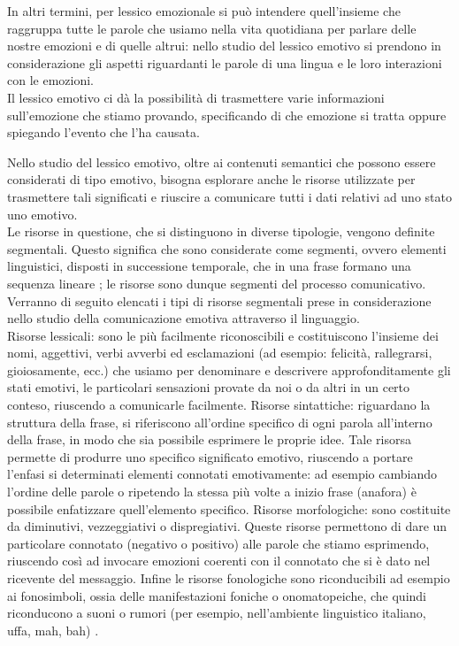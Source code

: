 In altri termini, per lessico emozionale si può intendere quell'insieme che raggruppa tutte le parole che usiamo nella vita quotidiana per parlare delle nostre emozioni e di quelle altrui: nello studio del lessico emotivo si prendono in considerazione gli aspetti riguardanti le parole di una lingua e le loro interazioni con le emozioni.\\
Il lessico emotivo ci dà la possibilità di trasmettere varie informazioni sull'emozione che stiamo provando, specificando di che emozione si tratta oppure spiegando l'evento che l'ha causata.

Nello studio del lessico emotivo, oltre ai contenuti semantici che possono essere considerati di tipo emotivo, bisogna esplorare anche le risorse utilizzate per trasmettere tali significati e riuscire a comunicare tutti i dati relativi ad uno stato uno emotivo.\\
Le risorse in questione, che si distinguono in diverse tipologie, vengono definite segmentali. Questo significa che sono considerate come segmenti, ovvero elementi linguistici, disposti in successione temporale, che in una frase formano una sequenza lineare \parencite{segmentale}; le risorse sono dunque segmenti del processo comunicativo.\\
Verranno di seguito elencati i tipi di risorse segmentali prese in considerazione nello studio della comunicazione emotiva attraverso il linguaggio.\\
Risorse lessicali: sono le più facilmente riconoscibili e costituiscono l'insieme dei nomi, aggettivi, verbi avverbi ed esclamazioni (ad esempio: felicità, rallegrarsi, gioiosamente, ecc.) che usiamo per denominare e descrivere approfonditamente gli stati emotivi, le particolari sensazioni provate da noi o da altri in un certo conteso, riuscendo a comunicarle facilmente. Risorse sintattiche: riguardano la struttura della frase, si riferiscono all'ordine specifico di ogni parola all'interno della frase, in modo che sia possibile esprimere le proprie idee. Tale risorsa permette di produrre uno specifico significato emotivo, riuscendo a portare l'enfasi si determinati elementi connotati emotivamente: ad esempio cambiando l'ordine delle parole o ripetendo la stessa più volte a inizio frase (anafora) è possibile enfatizzare quell'elemento specifico. 
Risorse morfologiche: sono costituite da diminutivi, vezzeggiativi o dispregiativi. Queste risorse permettono di dare un particolare connotato (negativo o positivo) alle parole che stiamo esprimendo, riuscendo così ad invocare emozioni coerenti con il connotato che si è dato nel ricevente del messaggio. 
Infine le risorse fonologiche sono riconducibili ad esempio ai fonosimboli, ossia delle manifestazioni foniche o onomatopeiche, che quindi riconducono a suoni o rumori (per esempio, nell'ambiente linguistico italiano, uffa, mah, bah) \parencite{fonosimbolo}.

